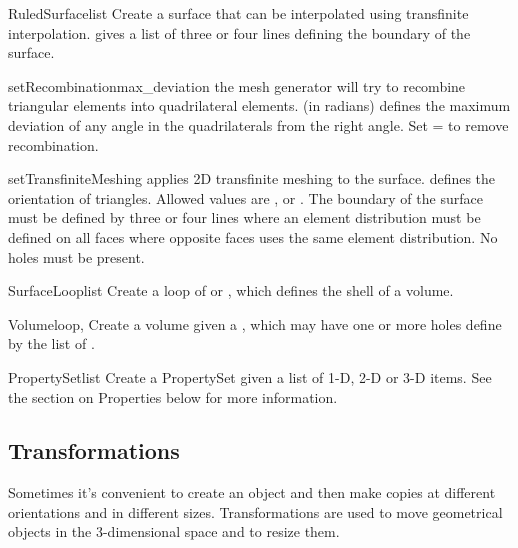 \begin{classdesc}{RuledSurface}{list}
Create a surface that can be interpolated using transfinite interpolation.
 gives a list of three or four lines defining the boundary of the
surface.
\end{classdesc}
\begin{methoddesc}[RuledSurface]{setRecombination}{max_deviation}
the mesh generator will try to recombine triangular elements 
into quadrilateral elements.  (in radians) defines the
maximum deviation of any angle in the quadrilaterals from the right angle.  
Set = to remove recombination.
\end{methoddesc}
\begin{methoddesc}[RuledSurface]{setTransfiniteMeshing}{}
applies 2D transfinite meshing to the surface. 
 defines the orientation of triangles. Allowed values
are ,  or . The 
boundary of the surface must be defined by three or four lines where an
element distribution must be defined on all faces where opposite 
faces uses the same element distribution. No holes must be present.
\end{methoddesc}


\begin{classdesc}{SurfaceLoop}{list}
Create a loop of  or , which defines the shell of a volume.
\end{classdesc}

\begin{classdesc}{Volume}{loop, }
Create a volume given a , which may have one or more holes
define by the list of .
\end{classdesc}

\begin{classdesc}{PropertySet}{list}
Create a PropertySet given a list of 1-D, 2-D or 3-D items. See the section on Properties below for more information.
\end{classdesc}

\subsection{Transformations}

Sometimes it's convenient to create an object and then make copies at
different orientations and in different sizes.  Transformations are
used to move geometrical objects in the 3-dimensional space and to
resize them.

